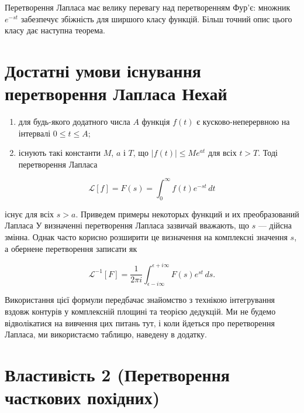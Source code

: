 \documentclass[
  ukrainian,
]{article}
\providecommand{\tightlist}{%
  \setlength{\itemsep}{0pt}\setlength{\parskip}{0pt}}
\begin{document}
Перетворення Лапласа має велику перевагу над перетворенням Фур'є:
множник \(e^{-st}\) забезпечує збіжність для ширшого класу функцій.
Більш точний опис цього класу дає наступна теорема.

\section{Достатні умови існування перетворення Лапласа
Нехай}\label{ux434ux43eux441ux442ux430ux442ux43dux456-ux443ux43cux43eux432ux438-ux456ux441ux43dux443ux432ux430ux43dux43dux44f-ux43fux435ux440ux435ux442ux432ux43eux440ux435ux43dux43dux44f-ux43bux430ux43fux43bux430ux441ux430-ux43dux435ux445ux430ux439}

\begin{enumerate}
\def\labelenumi{\arabic{enumi}.}
\tightlist
\item
  для будь-якого додатного числа \(A\) функція \(f(t)\) є
  кусково-неперервною на інтервалі \(0 \le t \le A\);
\item
  існують такі константи \(M\), \(a\) і \(T\), що \(|f(t)| \le Me^{at}\)
  для всіх \(t > T\). Тоді перетворення Лапласа
\end{enumerate}

\[
\mathscr{L}[f] = F(s) = \int_0^\infty f(t)e^{-st}\,dt
\]

існує для всіх \(s > a\). Приведем примеры некоторых функций и их
преобразований Лапласа У визначенні перетворення Лапласа зазвичай
вважають, що \(s\) --- дійсна змінна. Однак часто корисно розширити це
визначення на комплексні значення \(s\), а обернене перетворення
записати як

\[
\mathscr{L}^{-1}[F] = \frac{1}{2\pi i} \int_{\epsilon - i\infty}^{\epsilon + i\infty} F(s)e^{st}\,ds.
\]

Використання цієї формули передбачає знайомство з технікою інтегрування
вздовж контурів у комплексній площині та теорією дедукцій. Ми не будемо
відволікатися на вивчення цих питань тут, і коли йдеться про
перетворення Лапласа, ми використаємо таблицю, наведену в додатку.

\section{Властивість 2 (Перетворення часткових
похідних)}\label{ux432ux43bux430ux441ux442ux438ux432ux456ux441ux442ux44c-2-ux43fux435ux440ux435ux442ux432ux43eux440ux435ux43dux43dux44f-ux447ux430ux441ux442ux43aux43eux432ux438ux445-ux43fux43eux445ux456ux434ux43dux438ux445}
\end{document}
